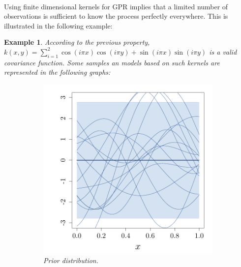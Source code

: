 \documentclass[twoside,openright]{report}
\newtheorem{example}{Example}
\begin{document}
\paragraph{}
Using finite dimensional kernels for GPR implies that a limited number of observations is sufficient to know the process perfectly everywhere. This is illustrated in the following example:
\begin{example}
    According to the previous property, $k(x,y) = \sum_{i=1}^2 \cos(i \pi x )\cos(i \pi y ) + \sin(i \pi x ) \sin(i \pi y )$ is a valid covariance function. Some samples an models based on such kernels are represented in the following graphs:
        \begin{figure}[ht!]
        \centering
        \begin{subfigure}[t]{0.30\textwidth}
                \includegraphics[width=\textwidth]{figures/ch5_finitedim0}
                \caption{Prior distribution.}
        \end{subfigure}%
        \hspace{0.2cm}       
        \begin{subfigure}[t]{0.30\textwidth}

\end{subfigure}
\end{figure}
\end{example}
\end{document}
